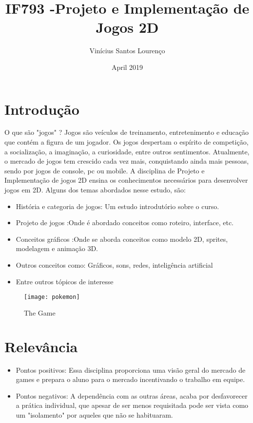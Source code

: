\documentclass[10pt]{article}
\title{IF793 -Projeto e Implementação de Jogos 2D}
\author{Vinícius Santos Lourenço }
\date{April 2019}
\begin{document}
\maketitle

\section{Introdução}
O que são "jogos" ? Jogos são veículos de treinamento, entretenimento e educação que contém a figura de um jogador. Os jogos despertam o espírito de competição, a socialização, a imaginação, a curiosidade, entre outros sentimentos. Atualmente, o mercado de jogos tem crescido cada vez mais, conquistando ainda mais pessoas, sendo por jogos de console, pc ou mobile.  A disciplina de Projeto e Implementação de jogos 2D\citep{pijcin} ensina os conhecimentos necessários para desenvolver jogos em 2D. Alguns dos temas abordados nesse estudo, são:
\begin{itemize}
\item História e categoria de jogos: Um estudo introdutório sobre o curso.
\item Projeto de jogos :Onde é abordado conceitos como roteiro, interface, etc.
\item Conceitos gráficos :Onde se aborda conceitos como modelo 2D, sprites, modelagem e animação 3D.
\item Outros conceitos como: Gráficos, sons, redes, inteligência artificial
\item Entre outros tópicos de interesse
\end{itemize}
\begin{figure}[h!]
\centering
\texttt{[image: pokemon]}
\caption{The Game \citep{imagempokemon}}
\label{fig:universe}
\end{figure}

\section{Relevância}
\begin{itemize}
\item Pontos positivos: Essa disciplina proporciona uma visão geral do mercado de games e prepara o aluno para o mercado incentivando o trabalho em equipe.
\item Pontos negativos: A dependência  com as outras áreas, acaba por desfavorecer a prática individual, que apesar de ser menos requisitada pode ser vista como um "isolamento" por aqueles que não se habituaram.
\end{itemize}
\end{document}
